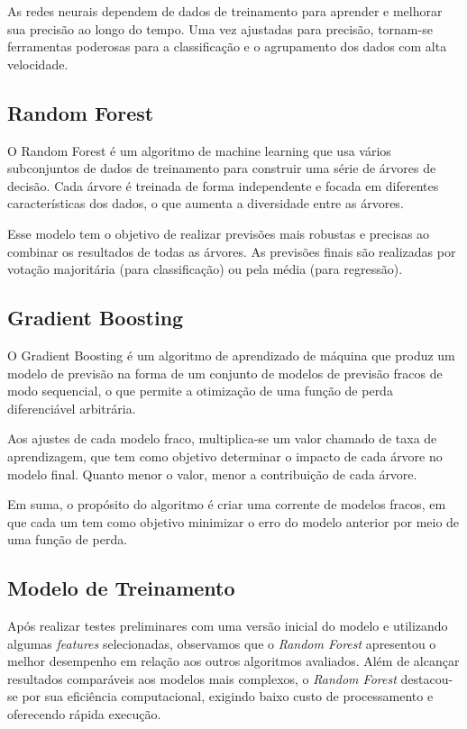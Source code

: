 \documentclass{article}
\begin{document}
As redes neurais dependem de dados de treinamento para aprender e melhorar sua precisão ao longo do tempo. Uma vez ajustadas para precisão, tornam-se ferramentas poderosas para a classificação e o agrupamento dos dados com alta velocidade. 

\subsection{Random Forest}

O Random Forest é um algoritmo de machine learning que usa vários subconjuntos de dados de treinamento para construir uma série de árvores de decisão. Cada árvore é treinada de forma independente e focada em diferentes características dos dados, o que aumenta a diversidade entre as árvores.

Esse modelo tem o objetivo de realizar previsões mais robustas e precisas ao combinar os resultados de todas as árvores. As previsões finais são realizadas por votação majoritária (para classificação) ou pela média (para regressão).

\subsection{Gradient Boosting}

O Gradient Boosting é um algoritmo de aprendizado de máquina que produz um modelo de previsão na forma de um conjunto de modelos de previsão fracos de modo sequencial, o que permite a otimização de uma função de perda diferenciável arbitrária.

Aos ajustes de cada modelo fraco, multiplica-se um valor chamado de taxa de aprendizagem, que tem como objetivo determinar o impacto de cada árvore no modelo final. Quanto menor o valor, menor a contribuição de cada árvore.

Em suma, o propósito do algoritmo é criar uma corrente de modelos fracos, em que cada um tem como objetivo minimizar o erro do modelo anterior por meio de uma função de perda.

\subsection{Modelo de Treinamento}

Após realizar testes preliminares com uma versão inicial do modelo e utilizando algumas \textit{features} selecionadas, observamos que o \textit{Random Forest} apresentou o melhor desempenho em relação aos outros algoritmos avaliados. Além de alcançar resultados comparáveis aos modelos mais complexos, o \textit{Random Forest} destacou-se por sua eficiência computacional, exigindo baixo custo de processamento e oferecendo rápida execução. 
\end{document}
